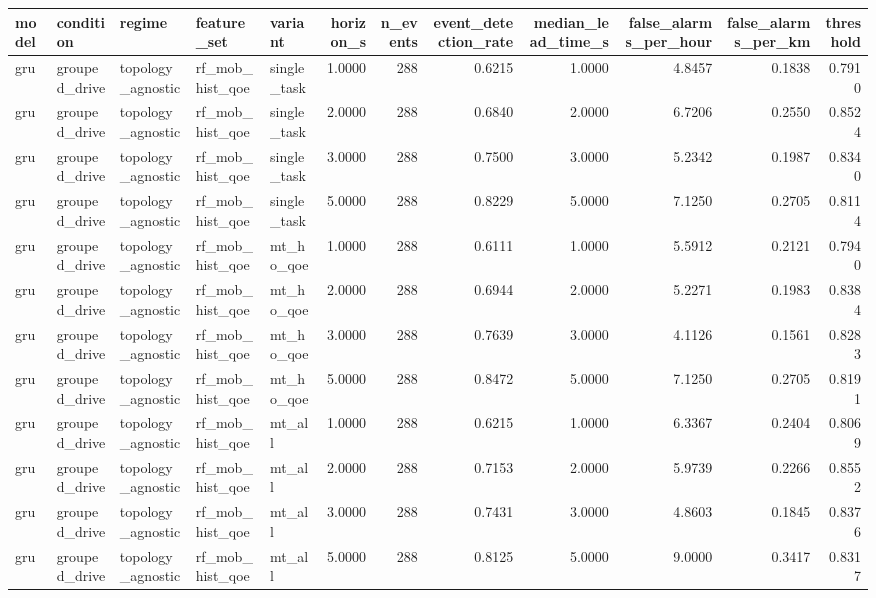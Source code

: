 \begin{tabular}{lllllrrrrrrr}
\toprule
model & condition & regime & feature\_set & variant & horizon\_s & n\_events & event\_detection\_rate & median\_lead\_time\_s & false\_alarms\_per\_hour & false\_alarms\_per\_km & threshold \\
\midrule
gru & grouped\_drive & topology\_agnostic & rf\_mob\_hist\_qoe & single\_task & 1.0000 & 288 & 0.6215 & 1.0000 & 4.8457 & 0.1838 & 0.7910 \\
gru & grouped\_drive & topology\_agnostic & rf\_mob\_hist\_qoe & single\_task & 2.0000 & 288 & 0.6840 & 2.0000 & 6.7206 & 0.2550 & 0.8524 \\
gru & grouped\_drive & topology\_agnostic & rf\_mob\_hist\_qoe & single\_task & 3.0000 & 288 & 0.7500 & 3.0000 & 5.2342 & 0.1987 & 0.8340 \\
gru & grouped\_drive & topology\_agnostic & rf\_mob\_hist\_qoe & single\_task & 5.0000 & 288 & 0.8229 & 5.0000 & 7.1250 & 0.2705 & 0.8114 \\
gru & grouped\_drive & topology\_agnostic & rf\_mob\_hist\_qoe & mt\_ho\_qoe & 1.0000 & 288 & 0.6111 & 1.0000 & 5.5912 & 0.2121 & 0.7940 \\
gru & grouped\_drive & topology\_agnostic & rf\_mob\_hist\_qoe & mt\_ho\_qoe & 2.0000 & 288 & 0.6944 & 2.0000 & 5.2271 & 0.1983 & 0.8384 \\
gru & grouped\_drive & topology\_agnostic & rf\_mob\_hist\_qoe & mt\_ho\_qoe & 3.0000 & 288 & 0.7639 & 3.0000 & 4.1126 & 0.1561 & 0.8283 \\
gru & grouped\_drive & topology\_agnostic & rf\_mob\_hist\_qoe & mt\_ho\_qoe & 5.0000 & 288 & 0.8472 & 5.0000 & 7.1250 & 0.2705 & 0.8191 \\
gru & grouped\_drive & topology\_agnostic & rf\_mob\_hist\_qoe & mt\_all & 1.0000 & 288 & 0.6215 & 1.0000 & 6.3367 & 0.2404 & 0.8069 \\
gru & grouped\_drive & topology\_agnostic & rf\_mob\_hist\_qoe & mt\_all & 2.0000 & 288 & 0.7153 & 2.0000 & 5.9739 & 0.2266 & 0.8552 \\
gru & grouped\_drive & topology\_agnostic & rf\_mob\_hist\_qoe & mt\_all & 3.0000 & 288 & 0.7431 & 3.0000 & 4.8603 & 0.1845 & 0.8376 \\
gru & grouped\_drive & topology\_agnostic & rf\_mob\_hist\_qoe & mt\_all & 5.0000 & 288 & 0.8125 & 5.0000 & 9.0000 & 0.3417 & 0.8317 \\
\bottomrule
\end{tabular}
